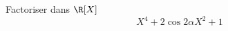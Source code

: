  Factoriser dans $\R[X]$
\begin{displaymath}
X^4+2\cos 2\alpha X^2 +1 
\end{displaymath}

\bigskip \bigskip 